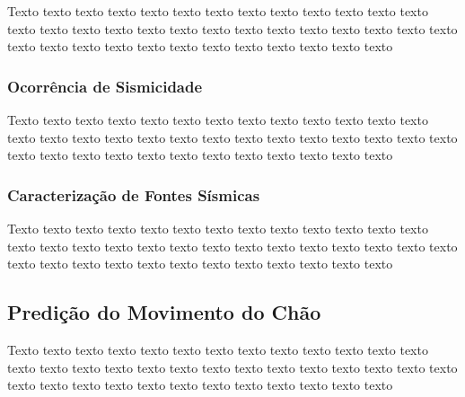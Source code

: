 Texto texto texto texto texto texto texto texto texto texto texto texto texto
texto texto texto texto texto texto texto texto texto texto texto texto texto
texto texto texto texto texto texto texto texto texto texto texto texto texto


\subsubsection{Ocorrência de Sismicidade}
\label{sec:fontes}




Texto texto texto texto texto texto texto texto texto texto texto texto texto
texto texto texto texto texto texto texto texto texto texto texto texto texto
texto texto texto texto texto texto texto texto texto texto texto texto texto



\subsubsection{Caracterização de Fontes Sísmicas}
\label{sec:fontes}



Texto texto texto texto texto texto texto texto texto texto texto texto texto
texto texto texto texto texto texto texto texto texto texto texto texto texto
texto texto texto texto texto texto texto texto texto texto texto texto texto





\subsection{Predição do Movimento do Chão} 
\label{sec:gmpe}


Texto texto texto texto texto texto texto texto texto texto texto texto texto
texto texto texto texto texto texto texto texto texto texto texto texto texto
texto texto texto texto texto texto texto texto texto texto texto texto texto


